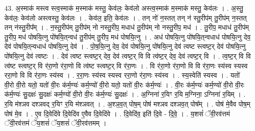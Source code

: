 \documentclass[17pt]{extarticle}
\begin{document}
43. अ॒स्माक॑ मस्त्व स्त्व॒स्माक॑ म॒स्माक॑ मस्तु॒ केव॑लः॒ केव॑लो अस्त्व॒स्माक॑ म॒स्माक॑ मस्तु॒ केव॑लः । . अ॒स्तु॒ केव॑लः॒ केव॑लो अस्त्वस्तु॒ केव॑लः । . केव॑ल॒ इति॒ केव॑लः । . तन् नो॑ न॒स्तत् तन् न॑ स्तु॒रीप॑म् तु॒रीप॑म् न॒स्तत् तन् न॑स्तु॒रीप᳚म् । . न॒स्तु॒रीप॑म् तु॒रीप॑म् नो नस्तु॒रीप॒ मधाध॑ तु॒रीप॑म् नो नस्तु॒रीप॒ मध॑ । . तु॒रीप॒ मधाध॑ तु॒रीप॑म् तु॒रीप॒ मध॑ पोषयि॒त्नु पो॑षयि॒त्‌न्वध॑ तु॒रीप॑म् तु॒रीप॒ मध॑ पोषयि॒त्नु । . अध॑ पोषयि॒त्नु पो॑षयि॒त्‌न्वधाध॑ पोषयि॒त्नु देव॒ देव॑ पोषयि॒त्‌न्वधाध॑ पोषयि॒त्नु देव॑ । . पो॒ष॒यि॒त्नु देव॒ देव॑ पोषयि॒त्नु पो॑षयि॒त्नु देव॑ त्वष्ट स्त्वष्ट॒र् देव॑ पोषयि॒त्नु पो॑षयि॒त्नु देव॑ त्वष्टः । . देव॑ त्वष्ट स्त्वष्ट॒र् देव॒ देव॑ त्वष्ट॒र् वि वि त्व॑ष्ट॒र् देव॒ देव॑ त्वष्ट॒र् वि । . त्व॒ष्ट॒र् वि वि त्व॑ष्ट स्त्वष्ट॒र् वि र॑रा॒णो र॑रा॒णो वि त्व॑ष्ट स्त्वष्ट॒र् वि र॑रा॒णः । . वि र॑रा॒णो र॑रा॒णो वि वि र॑रा॒णः स्य॑स्व स्यस्व ररा॒णो वि वि र॑रा॒णः स्य॑स्व । . र॒रा॒णः स्य॑स्व स्यस्व ररा॒णो र॑रा॒णः स्य॑स्व । . स्य॒स्वेति॑ स्यस्व । . यतो॑ वी॒रो वी॒रो यतो॒ यतो॑ वी॒रः क॑र्म॒ण्यः॑ कर्म॒ण्यो॑ वी॒रो यतो॒ यतो॑ वी॒रः क॑र्म॒ण्यः॑ । . वी॒रः क॑र्म॒ण्यः॑ कर्म॒ण्यो॑ वी॒रो वी॒रः क॑र्म॒ण्यः॑ सु॒दक्षः॑ सु॒दक्षः॑ कर्म॒ण्यो॑ वी॒रो वी॒रः क॑र्म॒ण्यः॑ सु॒दक्षः॑ । . अ॒ग्निना॑ र॒यिꣳ र॒यि म॒ग्निना॒ ऽग्निना॑ र॒यिम् । . र॒यि म॑श्ञव दश्ञवद् र॒यिꣳ र॒यि म॑श्ञवत् । . अ॒श्ञ॒व॒त् पोष॒म् पोष॑ मश्ञव दश्ञव॒त् पोष᳚म् । . पोष॑ मे॒वैव पोष॒म् पोष॑ मे॒व । . ए॒व दि॒वेदि॑वे दि॒वेदि॑व ए॒वैव दि॒वेदि॑वे । . दि॒वेदि॑व॒ इति॑ दि॒वे - दि॒वे॒ । . य॒शसं॑ ॅवी॒रव॑त्तमं ॅवी॒रव॑त्तमं ॅय॒शसं॑ ॅय॒शसं॑ ॅवी॒रव॑त्तमम् । \newline
\end{document}
